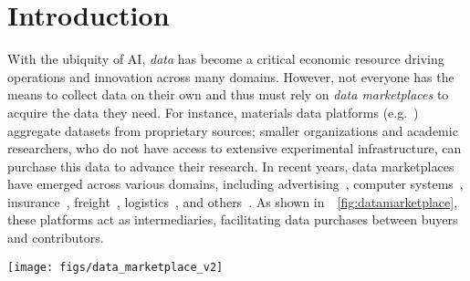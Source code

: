 \section{Introduction}

With the ubiquity of AI, \emph{data} has become a critical economic resource
driving operations and innovation across many domains.
However, not everyone has the means to
collect data on their own
 and thus must rely on \emph{data marketplaces} to acquire the data they
need. For instance, materials data platforms (e.g.~\citep{citrine}) aggregate datasets
from proprietary sources; smaller organizations and academic researchers, who do not have
access to extensive experimental infrastructure, can purchase this
data to advance their research.
In recent years, data marketplaces have emerged across various domains,
including 
advertising~\cite{googleads,databrickssharing},
computer systems~\cite{azuredatashare,awshub},
insurance~\cite{datarade},
freight~\cite{freightdat},
logistics~\cite{bloombergeap}, 
and others~\citep{awsdataexchange,ibmdatafabric,snowflake}. 
As shown in~\fig~\ref{fig:datamarketplace},
these platforms act as intermediaries,
facilitating data purchases between buyers and contributors.



\begin{figure*}[b]
\vspace{-0.06in}
\centering
\texttt{[image: figs/data\_marketplace\_v2]}
\vspace{-0.12in}
\caption{\small%
An illustration of a data marketplace.
(1) Data contributors collect and submit their data.
(2) A \emph{broker} operating the marketplace evaluates
 the quality of their submissions and prices the data.
(3) The broker sells subsets of this dataset to the buyers.
(4) The revenue is redistributed back to the contributors.
\label{fig:datamarketplace}
}
\end{figure*}



